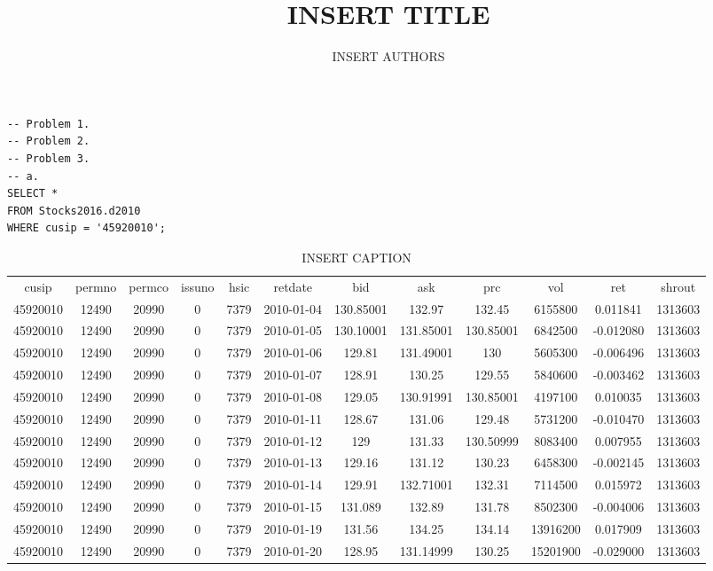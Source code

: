 \documentclass[12 pt]{article}
\begin{document}
 
\title{INSERT TITLE} 
\author{INSERT AUTHORS} 
\maketitle 
\begin{flushleft}\begin{verbatim} 
-- Problem 1.
-- Problem 2.
-- Problem 3. 
-- a.
SELECT *
FROM Stocks2016.d2010
WHERE cusip = '45920010'; 
 \end{verbatim} 
\begin{table}[h] 
\centering 
\caption{INSERT CAPTION} 
\label{my - label} 
\begin{tabular}{c c c c c c c c c c c c } 
\\
cusip & permno & permco & issuno & hsic & retdate & bid & ask & prc & vol & ret & shrout\\
45920010 & 12490 & 20990 & 0 & 7379 & 2010-01-04 & 130.85001 & 132.97 & 132.45 & 6155800 & 0.011841 & 1313603\\
45920010 & 12490 & 20990 & 0 & 7379 & 2010-01-05 & 130.10001 & 131.85001 & 130.85001 & 6842500 & -0.012080 & 1313603\\
45920010 & 12490 & 20990 & 0 & 7379 & 2010-01-06 & 129.81 & 131.49001 & 130 & 5605300 & -0.006496 & 1313603\\
45920010 & 12490 & 20990 & 0 & 7379 & 2010-01-07 & 128.91 & 130.25 & 129.55 & 5840600 & -0.003462 & 1313603\\
45920010 & 12490 & 20990 & 0 & 7379 & 2010-01-08 & 129.05 & 130.91991 & 130.85001 & 4197100 & 0.010035 & 1313603\\
45920010 & 12490 & 20990 & 0 & 7379 & 2010-01-11 & 128.67 & 131.06 & 129.48 & 5731200 & -0.010470 & 1313603\\
45920010 & 12490 & 20990 & 0 & 7379 & 2010-01-12 & 129 & 131.33 & 130.50999 & 8083400 & 0.007955 & 1313603\\
45920010 & 12490 & 20990 & 0 & 7379 & 2010-01-13 & 129.16 & 131.12 & 130.23 & 6458300 & -0.002145 & 1313603\\
45920010 & 12490 & 20990 & 0 & 7379 & 2010-01-14 & 129.91 & 132.71001 & 132.31 & 7114500 & 0.015972 & 1313603\\
45920010 & 12490 & 20990 & 0 & 7379 & 2010-01-15 & 131.089 & 132.89 & 131.78 & 8502300 & -0.004006 & 1313603\\
45920010 & 12490 & 20990 & 0 & 7379 & 2010-01-19 & 131.56 & 134.25 & 134.14 & 13916200 & 0.017909 & 1313603\\
45920010 & 12490 & 20990 & 0 & 7379 & 2010-01-20 & 128.95 & 131.14999 & 130.25 & 15201900 & -0.029000 & 1313603\\

\end{tabular}
\end{table}
\end{flushleft}
\end{document}
